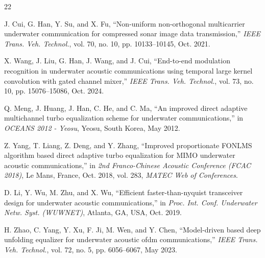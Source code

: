 \documentclass[lettersize,journal]{IEEEtran}
\begin{document}


%

\begin{thebibliography}{22}


J. Cui, G. Han, Y. Su, and X. Fu, ``Non-uniform non-orthogonal multicarrier underwater communication for compressed sonar image data transmission,'' \textit{IEEE Trans. Veh. Technol.}, vol. 70, no. 10, pp. 10133--10145, Oct. 2021.

X. Wang, J. Liu, G. Han, J. Wang, and J. Cui, ``End-to-end modulation recognition in underwater acoustic communications using temporal large kernel convolution with gated channel mixer,'' \textit{IEEE Trans. Veh. Technol.}, vol. 73, no. 10, pp. 15076--15086, Oct. 2024.

Q. Meng, J. Huang, J. Han, C. He, and C. Ma, ``An improved direct adaptive multichannel turbo equalization scheme for underwater communications,'' in \textit{OCEANS 2012 - Yeosu}, Yeosu, South Korea, May 2012.

Z. Yang, T. Liang, Z. Deng, and Y. Zhang, ``Improved proportionate FONLMS algorithm based direct adaptive turbo equalization for MIMO underwater acoustic communications,'' in \textit{2nd Franco-Chinese Acoustic Conference (FCAC 2018)}, Le Mans, France, Oct. 2018, vol. 283, \textit{MATEC Web of Conferences}.

D. Li, Y. Wu, M. Zhu, and X. Wu, ``Efficient faster-than-nyquist transceiver design for underwater acoustic communications,'' in \textit{Proc. Int. Conf. Underwater Netw. Syst. (WUWNET)}, Atlanta, GA, USA, Oct. 2019.

H. Zhao, C. Yang, Y. Xu, F. Ji, M. Wen, and Y. Chen, ``Model-driven based deep unfolding equalizer for underwater acoustic ofdm communications,'' \textit{IEEE Trans. Veh. Technol.}, vol. 72, no. 5, pp. 6056--6067, May 2023.


\end{thebibliography}
\end{document}
